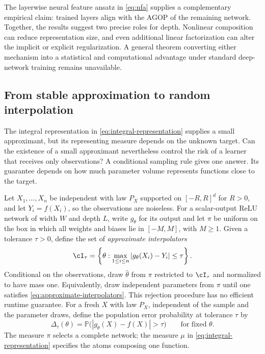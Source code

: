\documentclass[11pt,twoside]{article}
\renewcommand{\P}{\mathbb P}
\theoremstyle{definition}
\theoremstyle{remark}
\begin{document}
The layerwise neural feature ansatz in \cref{eq:nfa} supplies a complementary
empirical claim: trained layers align with the AGOP of the remaining network.
Together, the results suggest two precise roles for depth. Nonlinear
composition can reduce representation size, and even additional linear
factorization can alter the implicit or explicit regularization. A general
theorem converting either mechanism into a statistical and computational
advantage under standard deep-network training remains unavailable.

\subsection{From stable approximation to random interpolation}
\label{sec:deep-lifts}
\hypertarget{sec:deep-lifts}{}

The integral representation in \cref{eq:integral-representation} supplies a
small approximant, but its representing measure depends on the unknown
target. Can the existence of a small approximant nevertheless control the
risk of a learner that receives only observations? A conditional sampling
rule gives one answer. Its guarantee depends on how much parameter volume
represents functions close to the target.

Let $X_1,\ldots,X_n$ be independent with law $P_X$ supported on
$[-R,R]^d$ for $R>0$, and let $Y_i=f(X_i)$, so the observations are noiseless.
For a scalar-output ReLU network of width $W$ and depth $L$, write
$g_\theta$ for its output and let $\pi$ be uniform on the box in which all
weights and biases lie in $[-M,M]$, with $M\geq1$. Given a tolerance
$\tau>0$, define the set of \emph{approximate interpolators}
\begin{equation}
 \cI_\tau=\left\{\theta:\max_{1\leq i\leq n}
 |g_\theta(X_i)-Y_i|\leq\tau\right\}.
 \label{eq:approximate-interpolators}
\end{equation}
Conditional on the observations, draw $\widehat\theta$ from $\pi$ restricted
to $\cI_\tau$ and normalized to have mass one. Equivalently, draw independent
parameters from $\pi$ until one satisfies \cref{eq:approximate-interpolators}.
This rejection procedure has no efficient runtime guarantee. For a fresh
$X$ with law $P_X$, independent of the sample and the parameter draws, define
the population error probability at tolerance $\tau$ by
\begin{equation}
 \Delta_\tau(\theta)=\P\bigl(|g_\theta(X)-f(X)|>\tau\bigr)
 \qquad\text{for fixed }\theta.
 \label{eq:interpolation-tail-risk}
\end{equation}
The measure $\pi$ selects a complete network; the measure $\mu$ in
\cref{eq:integral-representation} specifies the atoms composing one function.
\end{document}
